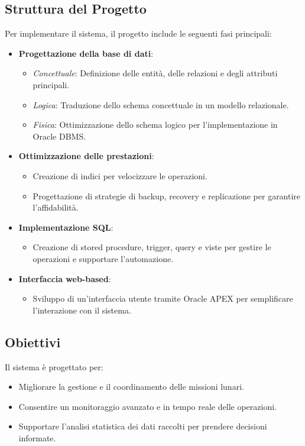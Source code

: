 \subsection{Struttura del Progetto}

Per implementare il sistema, il progetto include le seguenti fasi principali:
\begin{itemize}
    \item \textbf{Progettazione della base di dati}:
    \begin{itemize}
        \item \textit{Concettuale}: Definizione delle entità, delle relazioni e degli attributi principali.
        \item \textit{Logica}: Traduzione dello schema concettuale in un modello relazionale.
        \item \textit{Fisica}: Ottimizzazione dello schema logico per l'implementazione in Oracle DBMS.
    \end{itemize}
    \item \textbf{Ottimizzazione delle prestazioni}:
    \begin{itemize}
        \item Creazione di indici per velocizzare le operazioni.
        \item Progettazione di strategie di backup, recovery e replicazione per garantire l'affidabilità.
    \end{itemize}
    \item \textbf{Implementazione SQL}:
    \begin{itemize}
        \item Creazione di stored procedure, trigger, query e viste per gestire le operazioni e supportare l'automazione.
    \end{itemize}
    \item \textbf{Interfaccia web-based}:
    \begin{itemize}
        \item Sviluppo di un'interfaccia utente tramite Oracle APEX per semplificare l'interazione con il sistema.
    \end{itemize}
\end{itemize}

\subsection{Obiettivi}

Il sistema è progettato per:
\begin{itemize}
    \item Migliorare la gestione e il coordinamento delle missioni lunari.
    \item Consentire un monitoraggio avanzato e in tempo reale delle operazioni.
    \item Supportare l'analisi statistica dei dati raccolti per prendere decisioni informate.
\end{itemize}

